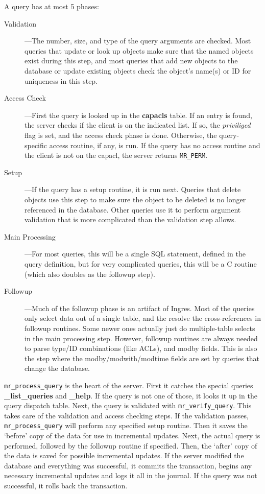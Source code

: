 A query has at most 5 phases:

\begin{description}
\item[Validation]---The number, size, and type of the query arguments
are checked. Most queries that update or look up objects make sure
that the named objects exist during this step, and most queries that
add new objects to the database or update existing objects check the
object's name(s) or ID for uniqueness in this step.

\item[Access Check]---First the query is looked up in the {\bf
capacls} table. If an entry is found, the server checks if the client
is on the indicated list. If so, the {\it priviliged\/} flag is set,
and the access check phase is done. Otherwise, the query-specific
access routine, if any, is run. If the query has no access routine and
the client is not on the capacl, the server returns {\tt MR\_PERM}.

\item[Setup]---If the query has a setup routine, it is run next.
Queries that delete objects use this step to make sure the object to
be deleted is no longer referenced in the database. Other queries use
it to perform argument validation that is more complicated than the
validation step allows.

\item[Main Processing]---For most queries, this will be a single SQL
statement, defined in the query definition, but for very complicated
queries, this will be a C routine (which also doubles as the followup
step).

\item[Followup]---Much of the followup phase is an artifact of Ingres.
Most of the queries only select data out of a single table, and the
resolve the cross-references in followup routines. Some newer ones
actually just do multiple-table selects in the main processing step.
However, followup routines are always needed to parse type/ID
combinations (like ACLs), and modby fields. This is also the step
where the modby/modwith/modtime fields are set by queries that change
the database.
\end{description}

{\tt mr\_process\_query} is the heart of the server. First it catches
the special queries {\bf \_list\_queries} and {\bf \_help}. If the
query is not one of those, it looks it up in the query dispatch table.
Next, the query is validated with {\tt mr\_verify\_query}. This takes
care of the validation and access checking steps. If the validation
passes, {\tt mr\_process\_query} will perform any specified setup
routine. Then it saves the `before' copy of the data for use in
incremental updates. Next, the actual query is performed, followed by
the followup routine if specified. Then, the `after' copy of the data
is saved for possible incremental updates. If the server modified the
database and everything was successful, it commits the transaction,
begins any necessary incremental updates and logs it all in the
journal. If the query was not successful, it rolls back the
transaction.

